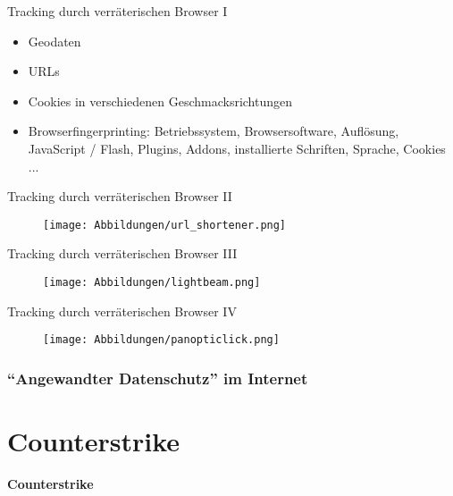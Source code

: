 \documentclass[hyperref={colorlinks,linkcolor=white}, utf8]{beamer}
\begin{document}
	
	\begin{frame}{Tracking durch verräterischen Browser I}
		\begin{itemize}
			\item Geodaten
			\item URLs 
			\item Cookies in verschiedenen Geschmacksrichtungen
			\item Browserfingerprinting: Betriebssystem, Browsersoftware, Auflösung, JavaScript / Flash, Plugins, Addons, installierte Schriften, Sprache, Cookies ...
		\end{itemize}
	\end{frame}
	
	\begin{frame}{Tracking durch verräterischen Browser II}
		\begin{figure}[V]
			\texttt{[image: Abbildungen/url\_shortener.png]}
			\label{fig:url shortener}
		\end{figure}
	\end{frame}
	
	\begin{frame}{Tracking durch verräterischen Browser III}
		\begin{figure}[V]
			\texttt{[image: Abbildungen/lightbeam.png]}
			\label{fig:lightbeam}
		\end{figure}
	\end{frame}
	
	\begin{frame}{Tracking durch verräterischen Browser IV}
		\begin{figure}[V]
			\texttt{[image: Abbildungen/panopticlick.png]}
			\label{fig:panopticlick}
		\end{figure}
	\end{frame}
	
	\subsubsection{\enquote{Angewandter Datenschutz} im Internet}
	
	\section{Counterstrike}
	\begin{frame}
		\centering \huge \textbf{Counterstrike}
	\end{frame}
	
	
\end{document}
